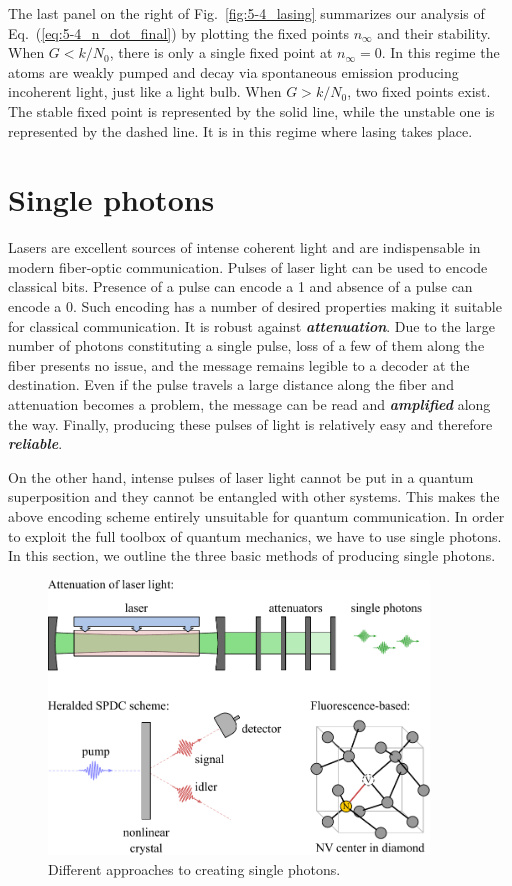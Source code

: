 The last panel on the right of Fig.~\ref{fig:5-4_lasing} summarizes our analysis of Eq.~(\ref{eq:5-4_n_dot_final}) by plotting the fixed points $n_{\infty}$ and their stability.
When $G < k / N_0$, there is only a single fixed point at $n_{\infty} = 0$.
In this regime the atoms are weakly pumped and decay via spontaneous emission producing incoherent light, just like a light bulb.
When $G > k / N_0$, two fixed points exist.
The stable fixed point is represented by the solid line, while the unstable one is represented by the dashed line.
It is in this regime where lasing takes place.


\section{Single photons}
\label{sec:5-5_single_photons}

Lasers are excellent sources of intense coherent light and are indispensable in modern fiber-optic communication.
Pulses of laser light can be used to encode classical bits.
Presence of a pulse can encode a 1 and absence of a pulse can encode a 0.
Such encoding has a number of desired properties making it suitable for classical communication.
It is robust against \textit{\textbf{attenuation}}.
Due to the large number of photons constituting a single pulse, loss of a few of them along the fiber presents no issue, and the message remains legible to a decoder at the destination.
Even if the pulse travels a large distance along the fiber and attenuation becomes a problem, the message can be read and \textit{\textbf{amplified}} along the way.
Finally, producing these pulses of light is relatively easy and therefore \textit{\textbf{reliable}}.

On the other hand, intense pulses of laser light cannot be put in a quantum superposition and they cannot be entangled with other systems.
This makes the above encoding scheme entirely unsuitable for quantum communication.
In order to exploit the full toolbox of quantum mechanics, we have to use single photons.
In this section, we outline the three basic methods of producing single photons.

\begin{figure}
    \centering
    \includegraphics[width=0.9\textwidth]{lesson5/5-5_single_photons.pdf}
    \caption[Single photon sources]{Different approaches to creating single photons.}
    \label{fig:5-5_single_photons}
\end{figure}

